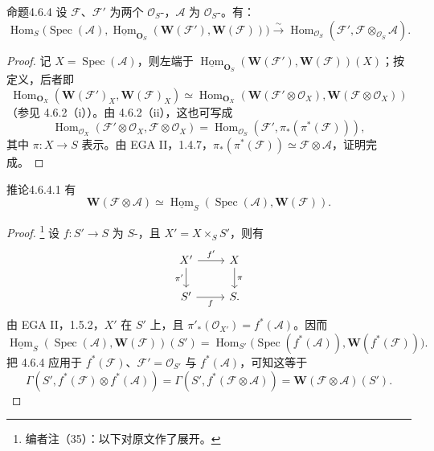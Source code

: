 \begin{SGAresult}{命题}{4.6.4}
设 $\mathcal F$、$\mathcal F'$ 为两个 $\mathcal O_S$-，$\mathcal A$ 为 $\mathcal O_S$-。有：
\[
\operatorname{Hom}_S\bigl(\operatorname{Spec}(\mathcal A),\underline{\operatorname{Hom}}_{\mathbf O_S}(\mathbf W(\mathcal F'),\mathbf W(\mathcal F))\bigr)\xrightarrow\sim\operatorname{Hom}_{\mathcal O_S}(\mathcal F',\mathcal F\otimes_{\mathcal O_S}\mathcal A).
\]
\end{SGAresult}
\begin{proof}
记 $X=\operatorname{Spec}(\mathcal A)$，则左端于 $\underline{\operatorname{Hom}}_{\mathbf O_S}(\mathbf W(\mathcal F'),\mathbf W(\mathcal F))(X)$；按定义，后者即
\[
\operatorname{Hom}_{\mathbf O_X}(\mathbf W(\mathcal F')_X,\mathbf W(\mathcal F)_X)\simeq\operatorname{Hom}_{\mathbf O_X}(\mathbf W(\mathcal F'\otimes\mathcal O_X),\mathbf W(\mathcal F\otimes\mathcal O_X))
\]
（参见 4.6.2（i））。由 4.6.2（ii），这也可写成
\[
\operatorname{Hom}_{\mathcal O_X}(\mathcal F'\otimes\mathcal O_X,\mathcal F\otimes\mathcal O_X)=\operatorname{Hom}_{\mathcal O_S}(\mathcal F',\pi_*(\pi^*(\mathcal F))),
\]
其中 $\pi:X\to S$ 表示。由 EGA II，1.4.7，$\pi_*(\pi^*(\mathcal F))\simeq\mathcal F\otimes\mathcal A$，证明完成。
\end{proof}
\begin{SGAresult}{推论}{4.6.4.1}
有
\[
\mathbf W(\mathcal F\otimes\mathcal A)\simeq\underline{\operatorname{Hom}}_S(\operatorname{Spec}(\mathcal A),\mathbf W(\mathcal F)).
\]
\end{SGAresult}
\begin{proof}
\footnote{编者注（35）：以下对原文作了展开。} 设 $f:S'\to S$ 为 $S$-，且 $X'=X\times_S S'$，则有
\[
\begin{tikzcd}
X'\arrow[r,"{f'}"]\arrow[d,"{\pi'}"']&X\arrow[d,"{\pi}"]\\
S'\arrow[r,"{f}"']&S.
\end{tikzcd}
\]
由 EGA II，1.5.2，$X'$ 在 $S'$ 上，且 $\pi'_*(\mathcal O_{X'})=f^*(\mathcal A)$。因而
\[
\underline{\operatorname{Hom}}_S(\operatorname{Spec}(\mathcal A),\mathbf W(\mathcal F))(S')=\operatorname{Hom}_{S'}\bigl(\operatorname{Spec}(f^*(\mathcal A)),\mathbf W(f^*(\mathcal F))\bigr).
\]
把 4.6.4 应用于 $f^*(\mathcal F)$、$\mathcal F'=\mathcal O_{S'}$ 与 $f^*(\mathcal A)$，可知这等于
\[
\Gamma(S',f^*(\mathcal F)\otimes f^*(\mathcal A))=\Gamma(S',f^*(\mathcal F\otimes\mathcal A))=\mathbf W(\mathcal F\otimes\mathcal A)(S').
\]
\end{proof}
